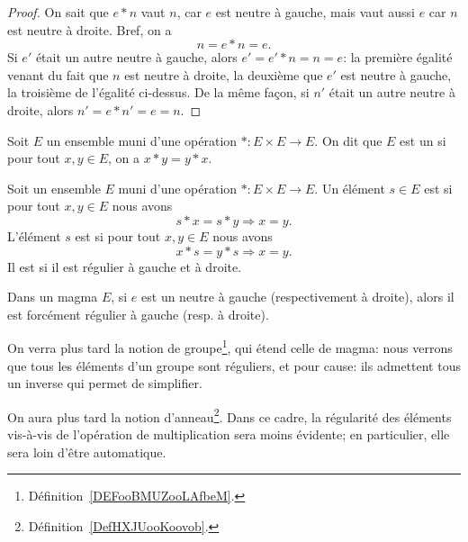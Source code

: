 \begin{proof}
	On sait que \( e*n \) vaut \( n \), car \( e \) est neutre à gauche, mais vaut aussi \( e \) car \( n \) est neutre à droite. Bref, on a
	\[
		n = e*n = e.
	\]
	Si \( e' \) était un autre neutre à gauche, alors \( e' = e' * n = n = e \): la première égalité venant du fait que \( n \) est neutre à droite, la deuxième que \( e' \) est neutre à gauche, la troisième de l'égalité ci-dessus. De la même façon, si \( n' \) était un autre neutre à droite, alors \( n' = e*n' = e = n \).
\end{proof}

\begin{definition}	\label{DEFooMagmaCommutatif}
	Soit \( E \) un ensemble muni d'une opération \( *\colon E\times E\to E\). On dit que \( E \) est un  si pour tout \( x, y \in E \), on a \( x * y = y * x\).
\end{definition}

\begin{definition}        \label{DEFooIJIEooZaAdSs}
	Soit un ensemble \( E\) muni d'une opération \( *\colon E\times E\to E\). Un élément \( s\in E\) est  si pour tout \( x,y\in E\) nous avons
	\begin{equation}
		s*x=s*y\Rightarrow x=y.
	\end{equation}
	L'élément \( s\) est  si pour tout \( x,y\in E\) nous avons
	\begin{equation}
		x*s=y*s\Rightarrow x=y.
	\end{equation}
	Il est  si il est régulier à gauche et à droite.
\end{definition}

\begin{remark}	\label{REMooMagmasEltsReguliers}
	Dans un magma \( E \), si \( e \) est un neutre à gauche (respectivement à droite), alors il est forcément régulier à gauche (resp. à droite).

	On verra plus tard la notion de groupe\footnote{Définition~\ref{DEFooBMUZooLAfbeM}.}, qui étend celle de magma: nous verrons que tous les éléments d'un groupe sont réguliers, et pour cause: ils admettent tous un inverse qui permet de simplifier.

	On aura plus tard la notion d'anneau\footnote{Définition~\ref{DefHXJUooKoovob}.}. Dans ce cadre, la régularité des éléments vis-à-vis de l'opération de multiplication sera moins évidente; en particulier, elle sera loin d'être automatique.
\end{remark}


